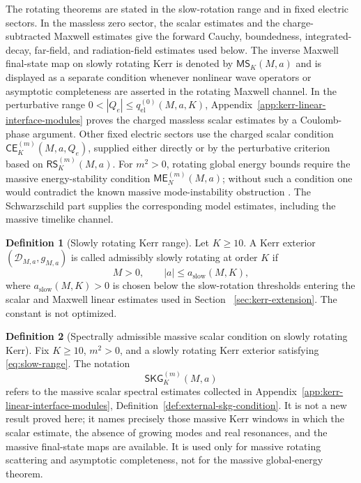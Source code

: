\documentclass[11pt]{article}
\numberwithin{equation}{section}
\theoremstyle{plain}
\theoremstyle{definition}
\newtheorem{definition}{Definition}[section]
\theoremstyle{remark}
\newcommand{\SKG}{\mathsf{SKG}}
\newcommand{\CElec}{\mathsf{CE}}
\newcommand{\RSLin}{\mathsf{RS}}
\newcommand{\ME}{\mathsf{ME}}
\newcommand{\MScat}{\mathsf{MS}}
\begin{document}
The rotating theorems are stated in the slow-rotation range and in fixed electric sectors.  In the massless zero sector, the scalar estimates \cite{DRSRKerr,DRSRKerrIII} and the charge-subtracted Maxwell estimates \cite{AnderssonBlueMaxwellSlowKerr} give the forward Cauchy, boundedness, integrated-decay, far-field, and radiation-field estimates used below.  The inverse Maxwell final-state map on slowly rotating Kerr is denoted by \(\MScat_K(M,a)\) and is displayed as a separate condition whenever nonlinear wave operators or asymptotic completeness are asserted in the rotating Maxwell channel.  In the perturbative range \(0<|Q_e|\le q^{(0)}_{\mathrm{el}}(M,a,K)\), Appendix~\ref{app:kerr-linear-interface-modules} proves the charged massless scalar estimates by a Coulomb-phase argument.  Other fixed electric sectors use the charged scalar condition \(\CElec^{(m)}_K(M,a,Q_e)\), supplied either directly or by the perturbative criterion based on \(\RSLin^{(m)}_K(M,a)\).  For $m^2>0$, rotating global energy bounds require the massive energy-stability condition \(\ME^{(m)}_N(M,a)\); without such a condition one would contradict the known massive mode-instability obstruction \cite{ShlapentokhRothmanKGKerr}.  The Schwarzschild part supplies the corresponding model estimates, including the massive timelike channel.

\begin{definition}[Slowly rotating Kerr range]\label{def:slow-kerr-range}
Let $K\ge10$.  A Kerr exterior $(\mathcal D_{M,a},g_{M,a})$ is called admissibly slowly rotating at order $K$ if
\begin{equation}\label{eq:slow-range}
 M>0,
 \qquad
 |a|\le a_{\mathrm{slow}}(M,K),
\end{equation}
where $a_{\mathrm{slow}}(M,K)>0$ is chosen below the slow-rotation thresholds entering the scalar and Maxwell linear estimates used in Section~
\ref{sec:kerr-extension}.  The constant is not optimized.
\end{definition}

\begin{definition}[Spectrally admissible massive scalar condition on slowly rotating Kerr]\label{def:slow-massive-scalar-condition}
Fix $K\ge10$, $m^2>0$, and a slowly rotating Kerr exterior satisfying \eqref{eq:slow-range}.  The notation
\begin{equation}\label{eq:skg-condition-symbol}
 \SKG^{(m)}_K(M,a)
\end{equation}
refers to the massive scalar spectral estimates collected in Appendix~\ref{app:kerr-linear-interface-modules}, Definition~\ref{def:external-skg-condition}.  It is not a new result proved here; it names precisely those massive Kerr windows in which the scalar estimate, the absence of growing modes and real resonances, and the massive final-state maps are available.  It is used only for massive rotating scattering and asymptotic completeness, not for the massive global-energy theorem.
\end{definition}
\end{document}
